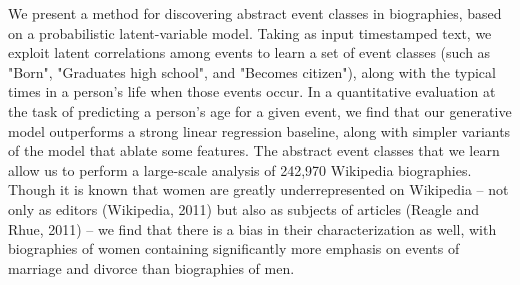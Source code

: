 We present a method for discovering abstract event classes in biographies, based on a probabilistic latent-variable model. Taking as input timestamped text, we exploit latent correlations among events to learn a set of event classes (such as "Born", "Graduates high school", and "Becomes citizen"), along with the typical times in a person's life when those events occur. In a quantitative evaluation at the task of predicting a person's age for a given event, we find that our generative model outperforms a strong linear regression baseline, along with simpler variants of the model that ablate some features. The abstract event classes that we learn allow us to perform a large-scale analysis of 242,970 Wikipedia biographies. Though it is known that women are greatly underrepresented on Wikipedia -- not only as editors (Wikipedia, 2011) but also as subjects of articles (Reagle and Rhue, 2011) -- we find that there is a bias in their characterization as well, with biographies of women containing significantly more emphasis on events of marriage and divorce than biographies of men.